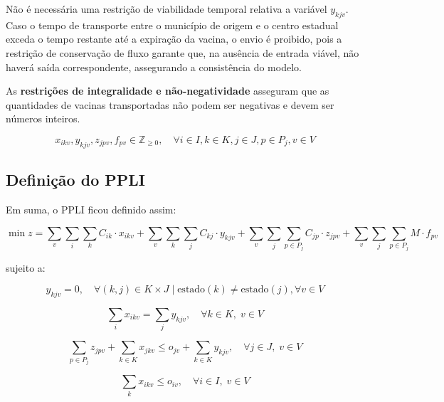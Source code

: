 Não é necessária uma restrição de viabilidade temporal relativa a variável $y_{kjv}$. Caso o tempo de transporte entre o município de origem e o centro estadual exceda o tempo restante até a expiração da vacina, o envio é proibido, pois a restrição de conservação de fluxo garante que, na ausência de entrada viável, não haverá saída correspondente, assegurando a consistência do modelo.

As \textbf{restrições de integralidade e não-negatividade} asseguram que as quantidades de vacinas transportadas não podem ser negativas e devem ser números inteiros.

\begin{equation*}
x_{ikv}, y_{kjv}, z_{jpv}, f_{pv} \in \mathbb{Z}_{\geq 0}, \quad \forall i \in I, k \in K, j \in J, p \in P_j, v \in V
\end{equation*}


\subsection{Definição do PPLI}

Em suma, o PPLI ficou definido assim:

\begin{equation*}
\min z =
\sum_{v} \sum_{i} \sum_{k} C_{ik} \cdot x_{ikv}
+
\sum_{v} \sum_{k} \sum_{j} C_{kj} \cdot y_{kjv}
+
\sum_{v} \sum_{j} \sum_{p \in P_j} C_{jp} \cdot z_{jpv}
+
\sum_{v} \sum_{j} \sum_{p \in P_j} M \cdot f_{pv}
\end{equation*}

sujeito a:

\begin{equation*}
y_{kjv} = 0, \quad \forall (k, j) \in K \times J \mid \text{estado}(k) \neq \text{estado}(j), \forall v \in V
\end{equation*}

\begin{equation*}
\sum_{i} x_{ikv} = \sum_{j} y_{kjv}, \quad \forall k \in K, \; v \in V
\end{equation*}

\begin{equation*}
\sum_{p \in P_j} z_{jpv} + \sum_{k \in K} x_{jkv} \le o_{jv} + \sum_{k \in K} y_{kjv}, \quad \forall j \in J, \; v \in V
\end{equation*}

\begin{equation*}
\sum_{k} x_{ikv} \le o_{iv}, \quad \forall i \in I, \; v \in V
\end{equation*}

